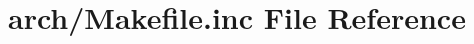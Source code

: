 \hypertarget{arch_2_makefile_8inc}{\section{arch/\+Makefile.inc File Reference}
\label{arch_2_makefile_8inc}
}
